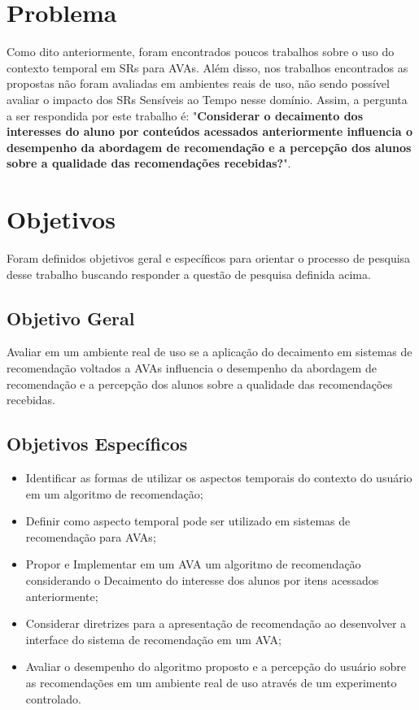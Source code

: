 \section{Problema}

Como dito anteriormente, foram encontrados poucos trabalhos sobre o uso do contexto temporal em SRs para AVAs. Além disso,
nos trabalhos encontrados as propostas não foram avaliadas em ambientes reais de uso, não sendo possível avaliar o
impacto dos SRs Sensíveis ao Tempo nesse domínio. Assim, a pergunta a ser respondida por este trabalho
é: "\textbf{Considerar o decaimento dos interesses do aluno por conteúdos acessados anteriormente influencia o desempenho
da abordagem de recomendação e a percepção dos alunos sobre a qualidade das recomendações recebidas?}".

\section{Objetivos}

Foram definidos objetivos geral e específicos para orientar o processo de pesquisa desse trabalho buscando responder a questão
de pesquisa definida acima.

\subsection{Objetivo Geral}

Avaliar em um ambiente real de uso se a aplicação do decaimento em sistemas de recomendação voltados a AVAs influencia o
desempenho da abordagem de recomendação e a percepção dos alunos sobre a qualidade das recomendações recebidas.

\subsection{Objetivos Específicos}

\begin{itemize}
\item Identificar as formas de utilizar os aspectos temporais do contexto do usuário em um algoritmo de recomendação;
\item Definir como aspecto temporal pode ser utilizado em sistemas de recomendação para AVAs;
\item Propor e Implementar em um AVA um algoritmo de recomendação considerando o Decaimento do interesse dos alunos por itens
acessados anteriormente;
\item Considerar diretrizes para a apresentação de recomendação ao desenvolver a interface do sistema de recomendação
em um AVA;
\item Avaliar o desempenho do algoritmo proposto e a percepção do usuário sobre as recomendações em um ambiente real de uso
através de um experimento controlado.
\end{itemize}

